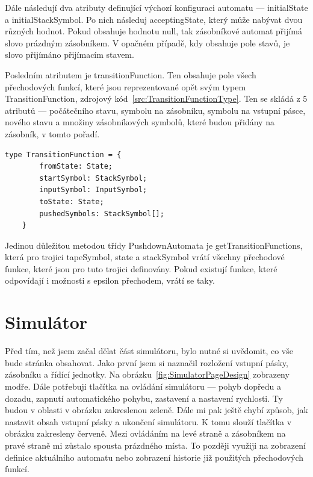 Dále následují dva atributy definující výchozí konfiguraci automatu --- initialState a initialStackSymbol. Po nich následuj acceptingState, který může nabývat dvou různých hodnot. Pokud obsahuje hodnotu null, tak zásobníkové automat přijímá slovo prázdným zásobníkem. V opačném případě, kdy obsahuje pole stavů, je slovo přijímáno přijímacím stavem.

Posledním atributem je transitionFunction. Ten obsahuje pole všech přechodových funkcí, které jsou reprezentované opět svým typem TransitionFunction, zdrojový kód~\ref{src:TransitionFunctionType}. Ten se skládá z 5 atributů --- počátečního stavu, symbolu na zásobníku, symbolu na vstupní pásce, nového stavu a množiny zásobníkových symbolů, které budou přidány na zásobník, v tomto pořadí.

\begin{lstlisting}[label=src:TransitionFunctionType, caption={Datové typ TransitionFunction}]
    type TransitionFunction = {
        fromState: State;
        startSymbol: StackSymbol;
        inputSymbol: InputSymbol;
        toState: State;
        pushedSymbols: StackSymbol[];
    }
\end{lstlisting}

Jedinou důležitou metodou třídy PushdownAutomata je getTransitionFunctions, která pro trojici tapeSymbol, state a stackSymbol vrátí všechny přechodové funkce, které jsou pro tuto trojici definovány. Pokud existují funkce, které odpovídají i možnosti s epsilon přechodem, vrátí se taky.

\section{Simulátor}

Před tím, než jsem začal dělat část simulátoru, bylo nutné si uvědomit, co vše bude stránka obsahovat. Jako první jsem si naznačil rozložení vstupní pásky, zásobníku a řídící jednotky. Na obrázku~\ref{fig:SimulatorPageDesign} zobrazeny modře. Dále potřebuji tlačítka na ovládání simulátoru --- pohyb dopředu a dozadu, zapnutí automatického pohybu, zastavení a nastavení rychlosti. Ty budou v oblasti v obrázku zakreslenou zeleně. Dále mi pak ještě chybí způsob, jak nastavit obsah vstupní pásky a ukončení simulátoru. K tomu slouží tlačítka v obrázku zakresleny červeně. Mezi ovládáním na levé straně a zásobníkem na pravé straně mi zůstalo spousta prázdného místa. To později využiji na zobrazení definice aktuálního automatu nebo zobrazení historie již použitých přechodových funkcí.

